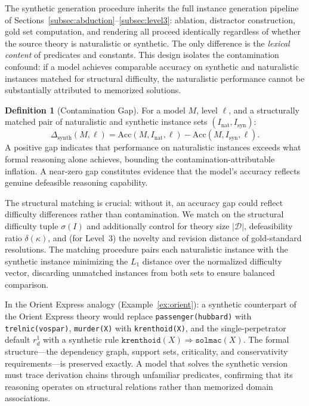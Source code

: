 \documentclass{article}
\theoremstyle{definition}
\newtheorem{definition}[theorem]{Definition}
\newcommand{\D}{\mathcal{D}}
\newcommand{\partfunc}{\kappa}
\newcommand{\defto}{\Rightarrow}
\begin{document}
The synthetic generation procedure inherits the full instance generation pipeline of Sections~\ref{subsec:abduction}--\ref{subsec:level3}: ablation, distractor construction, gold set computation, and rendering all proceed identically regardless of whether the source theory is naturalistic or synthetic. The only difference is the \emph{lexical content} of predicates and constants. This design isolates the contamination confound: if a model achieves comparable accuracy on synthetic and naturalistic instances matched for structural difficulty, the naturalistic performance cannot be substantially attributed to memorized solutions.

\begin{definition}[Contamination Gap]\label{def:contam_gap}
For a model $M$, level $\ell$, and a structurally matched pair of naturalistic and synthetic instance sets $(I_{\mathrm{nat}}, I_{\mathrm{syn}})$:
\[
    \Delta_{\mathrm{synth}}(M, \ell) = \mathrm{Acc}(M, I_{\mathrm{nat}}, \ell) - \mathrm{Acc}(M, I_{\mathrm{syn}}, \ell).
\]
A positive gap indicates that performance on naturalistic instances exceeds what formal reasoning alone achieves, bounding the contamination-attributable inflation. A near-zero gap constitutes evidence that the model's accuracy reflects genuine defeasible reasoning capability.
\end{definition}

The structural matching is crucial: without it, an accuracy gap could reflect difficulty differences rather than contamination. We match on the structural difficulty tuple $\sigma(I)$ and additionally control for theory size $|\D|$, defeasibility ratio $\delta(\partfunc)$, and (for Level~3) the novelty and revision distance of gold-standard resolutions. The matching procedure pairs each naturalistic instance with the synthetic instance minimizing the $L_1$ distance over the normalized difficulty vector, discarding unmatched instances from both sets to ensure balanced comparison.

In the Orient Express analogy (Example~\ref{ex:orient}): a synthetic counterpart of the Orient Express theory would replace \texttt{passenger(hubbard)} with \texttt{trelnic(vospar)}, \texttt{murder(X)} with \texttt{krenthoid(X)}, and the single-perpetrator default $r_d^1$ with a synthetic rule $\texttt{krenthoid}(X) \defto \texttt{solmac}(X)$. The formal structure---the dependency graph, support sets, criticality, and conservativity requirements---is preserved exactly. A model that solves the synthetic version must trace derivation chains through unfamiliar predicates, confirming that its reasoning operates on structural relations rather than memorized domain associations.
\end{document}
